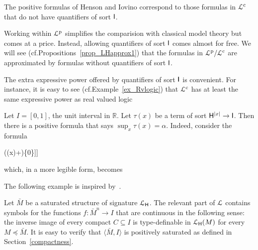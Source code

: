 \documentclass[10pt,oneside]{amsproc}
\def\dotminus{\stackon[.2ex]{$-$}{$.$}}
\def\forallH{\forall}
\def\forallI{\forall}
\newcommand\dangersign[1][3.5ex]{%
  \renewcommand\stacktype{L}%
  \scaleto{\stackon[1.9pt]{\Huge\color{red}$\triangle$}{\color{red}\bfseries\small !}}{#1}%
}
\begin{document}

The positive formulas of Henson and Iovino correspond to those formulas in ${\EuScript L}^{\rm c}$ that do not have quantifiers of sort ${\sf I}$.

Working within ${\EuScript L}^{\rm p}$ simplifies the comparision with classical model theory but comes at a price.
Instead, allowing quantifiers of sort ${\sf I}$ comes almost for free.
We will see (cf.\@ Propositions~\ref{prop_LHapprox1}) that the formulas in ${\EuScript L}^{\rm p}/{\EuScript L}^{\rm c}$ are approximated by formulas without quantifiers of sort ${\sf I}$.

The extra expressive power offered by quantifiers of sort ${\sf I}$ is convenient.
For instance, it is easy to see (cf.\@ Example~\ref{ex_Rvlogic}) that ${\EuScript L}^{\rm c}$ has at least the same expressive power as real valued logic%

\begin{example}\label{ex_Rvlogic}
  Let $I=[0,1]$, the unit interval in $\mathds{R}$.
  Let $\tau(x)$ be a term of sort ${\sf H}^{|x|}\to {\sf I}$.
  Then there is a positive formula that says $\sup_x \tau(x)=\alpha$.
  Indeed, consider the formula

  \ceq{\hfill\forallH x\ \big[\tau(x)\dotminus\alpha\in\{0\}\big]}
  {\wedge}{\forallI \varepsilon \Big[\varepsilon\in\{0\}\ \vee\ \exists x\ \big[\alpha\dotminus (\tau(x)+\varepsilon)\in\{0\}\big]\Big]}

  which, in a more legible form, becomes

  \ceq{\hfill\forallH x\ \big[\tau(x)\le\alpha\big]}{\wedge}{\forallI \varepsilon>0\ \exists x\ \big[\alpha\le \tau(x)+ \varepsilon\big].}
\end{example}

The following example is inspired by~\cite{HPP}.

\begin{example}\label{ex_HPP}
  Let $\bar M$ be a saturated structure of signature ${\EuScript L}_{\sf H}$.
  The relevant part of ${\EuScript L}$ contains symbols for the functions $f:\bar M^n\to I$ that are continuous in the following sense: the inverse image of every compact $C\subseteq I$ is type-definable in ${\EuScript L}_{\sf H}(M)$ for every $M\preceq\bar M$.
  It is easy to verify that $\langle\bar M, I\rangle$ is positively saturated as defined in Section~\ref{compactness}.
\end{example}
\end{document}
